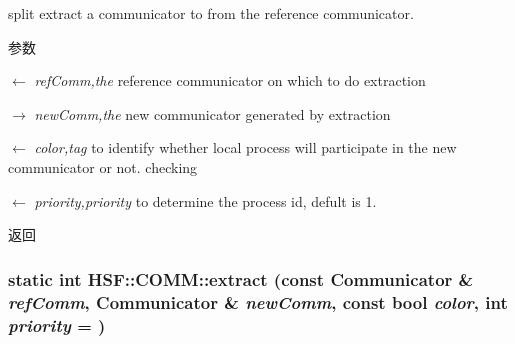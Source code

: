 split extract a communicator to from the reference communicator. 
\begin{DoxyParams}{参数}
\item[\mbox{$\leftarrow$} {\em refComm,the}]reference communicator on which to do extraction \item[\mbox{$\rightarrow$} {\em newComm,the}]new communicator generated by extraction \item[\mbox{$\leftarrow$} {\em color,tag}]to identify whether local process will participate in the new communicator or not. checking \item[\mbox{$\leftarrow$} {\em priority,priority}]to determine the process id, defult is 1. \end{DoxyParams}
\begin{DoxyReturn}{返回}

\end{DoxyReturn}
\hypertarget{classHSF_1_1COMM_a098fb0d3618c3ff9cd18f25eed6c8c25}{
\subsubsection[{extract}]{\setlength{\rightskip}{0pt plus 5cm}static int HSF::COMM::extract (const {\bf Communicator} \& {\em refComm}, \/  {\bf Communicator} \& {\em newComm}, \/  const bool {\em color}, \/  int {\em priority} = {})}}
\label{classHSF_1_1COMM_a098fb0d3618c3ff9cd18f25eed6c8c25}


